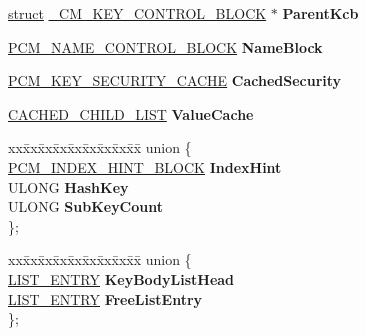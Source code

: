 \begin{DoxyCompactItemize}
\begin{tabbing}
\end{tabbing}\item 
\mbox{\label{struct___c_m___k_e_y___c_o_n_t_r_o_l___b_l_o_c_k_a8562aebc7f25c0c2e4dcae68c31c3e0b}} 
\hyperlink{interfacestruct}{struct} \hyperlink{struct___c_m___k_e_y___c_o_n_t_r_o_l___b_l_o_c_k}{\+\_\+\+C\+M\+\_\+\+K\+E\+Y\+\_\+\+C\+O\+N\+T\+R\+O\+L\+\_\+\+B\+L\+O\+CK} $\ast$ {\bfseries Parent\+Kcb}
\item 
\mbox{\label{struct___c_m___k_e_y___c_o_n_t_r_o_l___b_l_o_c_k_a420a40251591cf608c69898426387448}} 
\hyperlink{struct___c_m___n_a_m_e___c_o_n_t_r_o_l___b_l_o_c_k}{P\+C\+M\+\_\+\+N\+A\+M\+E\+\_\+\+C\+O\+N\+T\+R\+O\+L\+\_\+\+B\+L\+O\+CK} {\bfseries Name\+Block}
\item 
\mbox{\label{struct___c_m___k_e_y___c_o_n_t_r_o_l___b_l_o_c_k_af85245d3fa246c7b85f397dea5ea7824}} 
\hyperlink{struct___c_m___k_e_y___s_e_c_u_r_i_t_y___c_a_c_h_e}{P\+C\+M\+\_\+\+K\+E\+Y\+\_\+\+S\+E\+C\+U\+R\+I\+T\+Y\+\_\+\+C\+A\+C\+HE} {\bfseries Cached\+Security}
\item 
\mbox{\label{struct___c_m___k_e_y___c_o_n_t_r_o_l___b_l_o_c_k_af4a451f5e754e3144c5844a8a82dd4f8}} 
\hyperlink{struct___c_a_c_h_e_d___c_h_i_l_d___l_i_s_t}{C\+A\+C\+H\+E\+D\+\_\+\+C\+H\+I\+L\+D\+\_\+\+L\+I\+ST} {\bfseries Value\+Cache}
\item 
\mbox{\label{struct___c_m___k_e_y___c_o_n_t_r_o_l___b_l_o_c_k_ae1488572d2521d7b32d3ebdf8d5d21d8}} 
\begin{tabbing}
xx\=xx\=xx\=xx\=xx\=xx\=xx\=xx\=xx\=\kill
union \{\\
\>\hyperlink{struct___c_m___i_n_d_e_x___h_i_n_t___b_l_o_c_k}{PCM\_INDEX\_HINT\_BLOCK} {\bfseries IndexHint}\\
\>ULONG {\bfseries HashKey}\\
\>ULONG {\bfseries SubKeyCount}\\
\}; \\

\end{tabbing}\item 
\mbox{\label{struct___c_m___k_e_y___c_o_n_t_r_o_l___b_l_o_c_k_a494c963b7a8315460419b69489cc44e4}} 
\begin{tabbing}
xx\=xx\=xx\=xx\=xx\=xx\=xx\=xx\=xx\=\kill
union \{\\
\>\hyperlink{struct___l_i_s_t___e_n_t_r_y}{LIST\_ENTRY} {\bfseries KeyBodyListHead}\\
\>\hyperlink{struct___l_i_s_t___e_n_t_r_y}{LIST\_ENTRY} {\bfseries FreeListEntry}\\
\}; \\


\end{tabbing}
\end{DoxyCompactItemize}
